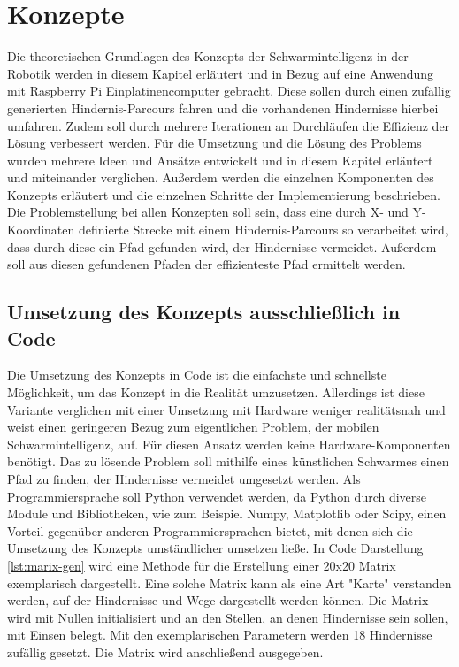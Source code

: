 \section{Konzepte}
Die theoretischen Grundlagen des Konzepts der Schwarmintelligenz in der Robotik werden in diesem Kapitel erläutert und in Bezug auf eine Anwendung mit Raspberry Pi Einplatinencomputer gebracht. Diese sollen durch einen zufällig generierten Hindernis-Parcours fahren und die vorhandenen Hindernisse hierbei umfahren. Zudem soll durch mehrere Iterationen an Durchläufen die Effizienz der Lösung verbessert werden. Für die Umsetzung und die Lösung des Problems wurden mehrere Ideen und Ansätze entwickelt und in diesem Kapitel erläutert und miteinander verglichen. Außerdem werden die einzelnen Komponenten des Konzepts erläutert und die einzelnen Schritte der Implementierung beschrieben. Die Problemstellung bei allen Konzepten soll sein, dass eine durch X- und Y-Koordinaten definierte Strecke mit einem Hindernis-Parcours so verarbeitet wird, dass durch diese ein Pfad gefunden wird, der Hindernisse vermeidet. Außerdem soll aus diesen gefundenen Pfaden der effizienteste Pfad ermittelt werden.

\subsection{Umsetzung des Konzepts ausschließlich in Code}
Die Umsetzung des Konzepts in Code ist die einfachste und schnellste Möglichkeit, um das Konzept in die Realität umzusetzen. Allerdings ist diese Variante verglichen mit einer Umsetzung mit Hardware weniger realitätsnah und weist einen geringeren Bezug zum eigentlichen Problem, der mobilen Schwarmintelligenz, auf. Für diesen Ansatz werden keine Hardware-Komponenten benötigt. Das zu lösende Problem soll mithilfe eines künstlichen Schwarmes einen Pfad zu finden, der Hindernisse vermeidet umgesetzt werden. Als Programmiersprache soll Python verwendet werden, da Python durch diverse Module und Bibliotheken, wie zum Beispiel Numpy, Matplotlib oder Scipy, einen Vorteil gegenüber anderen Programmiersprachen bietet, mit denen sich die Umsetzung des Konzepts umständlicher umsetzen ließe. In Code Darstellung \autoref{lst:marix-gen} wird eine Methode für die Erstellung einer 20x20 Matrix exemplarisch dargestellt. Eine solche Matrix kann als eine Art "Karte" verstanden werden, auf der Hindernisse und Wege dargestellt werden können. Die Matrix wird mit Nullen initialisiert und an den Stellen, an denen Hindernisse sein sollen, mit Einsen belegt. Mit den exemplarischen Parametern werden 18 Hindernisse zufällig gesetzt. Die Matrix wird anschließend ausgegeben.

